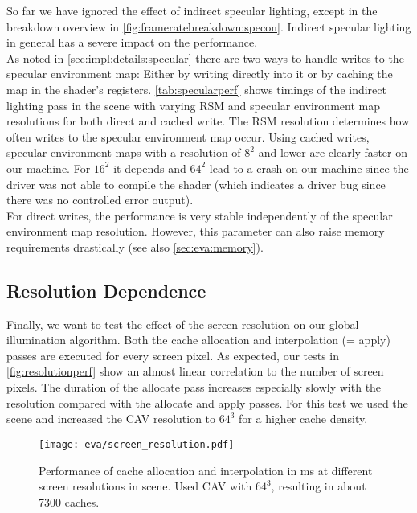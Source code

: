 \documentclass[thesis.tex]{subfiles}
\begin{document}
So far we have ignored the effect of indirect specular lighting, except in the breakdown overview in \autoref{fig:frameratebreakdown:specon}.
Indirect specular lighting in general has a severe impact on the performance.
\\
As noted in \autoref{sec:impl:details:specular} there are two ways to handle writes to the specular environment map:
Either by writing directly into it or by caching the map in the shader's registers.
\autoref{tab:specularperf} shows timings of the indirect lighting pass in the  scene with varying RSM and specular environment map resolutions for both direct and cached write.
The RSM resolution determines how often writes to the specular environment map occur.
Using cached writes, specular environment maps with a resolution of $8^2$ and lower are clearly faster on our machine.
For $16^2$ it depends and $64^2$ lead to a crash on our machine since the driver was not able to compile the shader (which indicates a driver bug since there was no controlled error output).
\\
For direct writes, the performance is very stable independently of the specular environment map resolution.
However, this parameter can also raise memory requirements drastically (see also \autoref{sec:eva:memory}).

\subsection{Resolution Dependence}
Finally, we want to test the effect of the screen resolution on our global illumination algorithm.
Both the cache allocation and interpolation (= apply) passes are executed for every screen pixel.
As expected, our tests in \autoref{fig:resolutionperf} show an almost linear correlation to the number of screen pixels.
The duration of the allocate pass increases especially slowly with the resolution compared with the allocate and apply passes.
For this test we used the  scene and increased the CAV resolution to $64^3$ for a higher cache density.
\begin{figure}[h!]
\centering
\texttt{[image: eva/screen\_resolution.pdf]}
\caption{Performance of cache allocation and interpolation in \si{\milli\second} at different screen resolutions in  scene. Used CAV with $64^3$, resulting in about 7300 caches.}
\label{fig:resolutionperf}
\end{figure}
\end{document}

